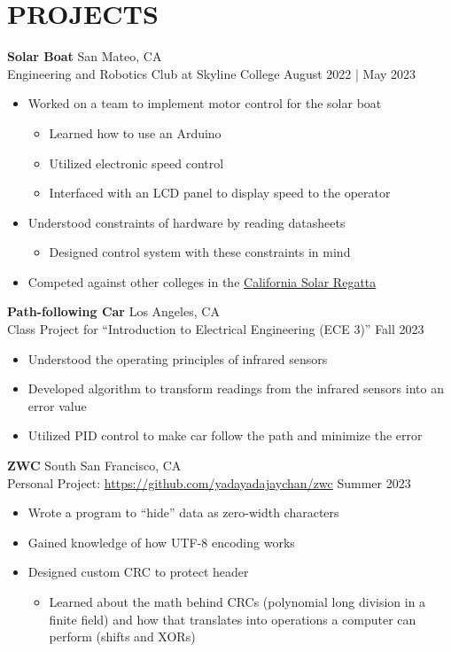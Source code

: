 \documentclass[letterpaper,9pt]{extarticle}
\begin{document}
\section*{PROJECTS}
\noindent
\textbf{Solar Boat} \hfill San Mateo, CA\\ %
Engineering and Robotics Club at Skyline College \hfill August 2022 | May 2023 %
\begin{itemize}
	\item Worked on a team to implement motor control for the solar boat
	\begin{itemize}
		\item Learned how to use an Arduino
		\item Utilized electronic speed control
		\item Interfaced with an LCD panel to display speed to the operator
	\end{itemize}
	\item Understood constraints of hardware by reading datasheets
	\begin{itemize}
		\item Designed control system with these constraints in mind
	\end{itemize}
	\item Competed against other colleges in the
		\href{https://www.smud.org/en/In-Our-Community/Workshops-and-education-resources/Teachers-and-students/Solar-Regatta}{California Solar Regatta}
\end{itemize}

\noindent
\textbf{Path-following Car} \hfill Los Angeles, CA\\ %
Class Project for ``Introduction to Electrical Engineering (ECE 3)'' \hfill Fall 2023
\begin{itemize}
	\item Understood the operating principles of infrared sensors
	\item Developed algorithm to transform readings from the infrared sensors into an error value
	\item Utilized PID control to make car follow the path and minimize the error
\end{itemize}

\noindent
\textbf{ZWC} \hfill South San Francisco, CA\\
Personal Project: \url{https://github.com/yadayadajaychan/zwc} \hfill Summer 2023
\begin{itemize}
	\item Wrote a program to ``hide'' data as zero-width characters
	\item Gained knowledge of how UTF-8 encoding works
	\item Designed custom CRC to protect header
	\begin{itemize}
		\item Learned about the math behind CRCs (polynomial long division in a finite field)
			and how that translates into operations a computer can perform (shifts and XORs)
	\end{itemize}
\end{itemize}
\end{document}
